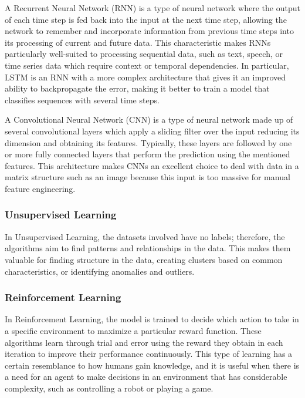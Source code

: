 A Recurrent Neural Network (RNN) is a type of neural network where the output of each time step is fed back into the input at the next time step, allowing the network to remember and incorporate information from previous time steps into its processing of current and future data. This characteristic makes RNNs particularly well-suited to processing sequential data, such as text, speech, or time series data which require context or temporal dependencies. In particular, LSTM is an RNN with a more complex architecture that gives it an improved ability to backpropagate the error, making it better to train a model that classifies sequences with several time steps.

A Convolutional Neural Network (CNN) is a type of neural network made up of several convolutional layers which apply a sliding filter over the input reducing its dimension and obtaining its features. Typically, these layers are followed by one or more fully connected layers that perform the prediction using the mentioned features. This architecture makes CNNs an excellent choice to deal with data in a matrix structure such as an image because this input is too massive for manual feature engineering.

\subsubsection{Unsupervised Learning}

In Unsupervised Learning, the datasets involved have no labels; therefore, the algorithms aim to find patterns and relationships in the data. This makes them valuable for finding structure in the data, creating clusters based on common characteristics, or identifying anomalies and outliers.

\subsubsection{Reinforcement Learning}

In Reinforcement Learning, the model is trained to decide which action to take in a specific environment to maximize a particular reward function. These algorithms learn through trial and error using the reward they obtain in each iteration to improve their performance continuously. This type of learning has a certain resemblance to how humans gain knowledge, and it is useful when there is a need for an agent to make decisions in an environment that has considerable complexity, such as controlling a robot or playing a game.

